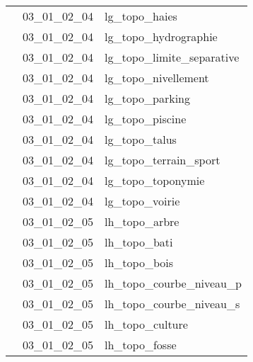 \documentclass[12pt,titlepage]{book}
\begin{document}
\begin{supertabular}{|p{10cm}|c|p{15cm}|}
                    & 03\_01\_02\_04 & lg\_topo\_haies\\


                    & 03\_01\_02\_04 & lg\_topo\_hydrographie\\


                    & 03\_01\_02\_04 & lg\_topo\_limite\_separative\\


                    & 03\_01\_02\_04 & lg\_topo\_nivellement\\


                    & 03\_01\_02\_04 & lg\_topo\_parking\\


                    & 03\_01\_02\_04 & lg\_topo\_piscine\\


                    & 03\_01\_02\_04 & lg\_topo\_talus\\


                    & 03\_01\_02\_04 & lg\_topo\_terrain\_sport\\


                    & 03\_01\_02\_04 & lg\_topo\_toponymie\\


                    & 03\_01\_02\_04 & lg\_topo\_voirie\\


                    & 03\_01\_02\_05 & lh\_topo\_arbre\\


                    & 03\_01\_02\_05 & lh\_topo\_bati\\


                    & 03\_01\_02\_05 & lh\_topo\_bois\\


                    & 03\_01\_02\_05 & lh\_topo\_courbe\_niveau\_p\\


                    & 03\_01\_02\_05 & lh\_topo\_courbe\_niveau\_s\\


                    & 03\_01\_02\_05 & lh\_topo\_culture\\


                    & 03\_01\_02\_05 & lh\_topo\_fosse\\



\end{supertabular}
\end{document}
